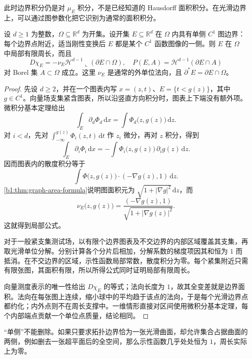 此时边界积分仍是对 \(\mu_E\) 积分，不是已经知道的 Hausdorff 面积积分。在光滑边界上，可以通过图参数化把它识别为通常的面积积分。

\begin{proposition}[光滑区域的周长]\label{b1:prop:smooth-domain-perimeter}
设 \(d\ge1\) 为整数，\(\Omega\subseteq\mathbb R^d\) 为开集。设开集 \(E\subseteq\mathbb R^d\) 在 \(\Omega\) 内具有单侧 \(C^1\) 图边界：每个边界点附近，适当刚性变换后 \(E\) 都是某个 \(C^1\) 函数图像的一侧。则 \(E\) 在 \(\Omega\) 中局部有限周长，而且
\begin{equation}\label{b1:eq:smooth-domain-perimeter}
 D\chi_E=-\nu_E\mathcal H^{d-1}\llcorner(\partial E\cap\Omega),
 \quad
 P(E,A)=\mathcal H^{d-1}(\partial E\cap A)
\end{equation}
对 Borel 集 \(A\subset\Omega\) 成立。这里 \(\nu_E\) 是通常的外单位法向，且 \(\partial^*E=\partial E\cap\Omega\)。
\end{proposition}
\begin{proof}
先设 \(d\ge2\)，并在一个图表内写 \(x=(z,t)\)、\(E=\{t<g(z)\}\)，其中 \(g\in C^1\)。向量场支集紧含图表，所以沿竖直方向积分时，图表上下端没有额外项。微积分基本定理给出
\[
 \int_E\partial_d\Phi_d\,\mathrm dx
 =\int\Phi_d\bigl(z,g(z)\bigr)\,\mathrm dz.
\]
对 \(i<d\)，先对
\(\int_{-\infty}^{g(z)}\Phi_i(z,t)\,\mathrm dt\)
作 \(z_i\) 微分，再对 \(z\) 积分，得到
\[
 \int_E\partial_i\Phi_i\,\mathrm dx
 =-\int\Phi_i\bigl(z,g(z)\bigr)\,\partial_i g(z)\,\mathrm dz.
\]
因而图表内的散度积分等于
\[
 \int \Phi\bigl(z,g(z)\bigr)\cdot(-\nabla g(z),1)\,\mathrm dz.
\]
\cref{b1:thm:graph-area-formula}说明图面积元为
\(\sqrt{1+|\nabla g|^2}\,\mathrm dz\)，而
\[
 \nu_E\bigl(z,g(z)\bigr)
 =\frac{(-\nabla g(z),1)}{\sqrt{1+|\nabla g(z)|^2}}.
\]
这就得到局部公式。

对于一般紧支集测试场，以有限个边界图表及不交边界的内部区域覆盖其支集，再取光滑单位分解。分别计算各个分片后相加，分解系数的梯度项因其和恒为 \(1\) 而抵消。在不交边界的区域，示性函数局部常数，散度积分为零。每个紧集附近只需有限张图，其面积有限，所以所得公式同时证明局部有限周长。

向量测度表示的唯一性给出 \(D\chi_E\) 的等式；法向长度为 \(1\)，故其全变差就是边界面积。法向在每张图上连续，缩小球中的平均趋于该点的法向，于是每个光滑边界点都约化；内外点则不在周长支撑中。一维情形直接对区间使用微积分基本定理，每个内部端点贡献一个单位点质量，结论相同。
\end{proof}

“单侧”不能删除。如果只要求拓扑边界恰为一张光滑曲面，却允许集合占据曲面的两侧，例如删去一张超平面后的全空间，那么示性函数几乎处处恒为 \(1\)，周长实际上为零。

